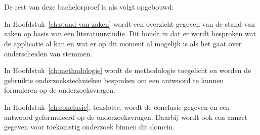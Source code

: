 \section{}%
\label{sec:opzet-bachelorproef}


De rest van deze bachelorproef is als volgt opgebouwd:

In Hoofdstuk~\ref{ch:stand-van-zaken} wordt een overzicht gegeven van de stand van zaken op basis van een literatuurstudie. Dit houdt in dat er wordt besproken wat de applicatie al kan en wat er op dit moment al mogelijk is als het gaat over onderscheiden van stemmen.

In Hoofdstuk~\ref{ch:methodologie} wordt de methodologie toegelicht en worden de gebruikte onderzoekstechnieken besproken om een antwoord te kunnen formuleren op de onderzoeksvragen.


In Hoofdstuk~\ref{ch:conclusie}, tenslotte, wordt de conclusie gegeven en een antwoord geformuleerd op de onderzoeksvragen. Daarbij wordt ook een aanzet gegeven voor toekomstig onderzoek binnen dit domein.